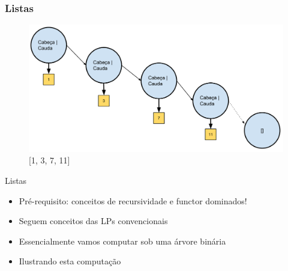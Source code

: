 \documentclass[sans]{beamer}
\begin{document}
\begin{frame}[fragile]   %
\frametitle{Listas}


 
\begin{figure}[!htb]
\centering
\includegraphics[scale = 0.3]{figuras/lista2.pdf}
\caption{[1, 3, 7, 11]}
\end{figure}
 
\end{frame}


\begin{frame}
\begin{block}{Listas}
\begin{itemize}

\item Pré-requisito: conceitos de recursividade e functor dominados!
\item Seguem conceitos das LPs convencionais
\item Essencialmente vamos computar sob uma árvore binária
\item Ilustrando esta computação 

\end{itemize}
\end{block}   
\end{frame}

\end{document}
